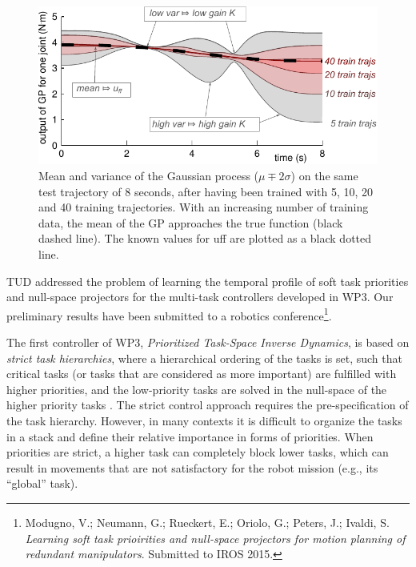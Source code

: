 \begin{figure}
  \centering
  \includegraphics[scale=0.8]{images/meanvariance.pdf}
  \caption{Mean and variance of the Gaussian process ($\mu \mp 2\sigma$) on
    the same test trajectory of 8 seconds, after having been trained with 5,
    10, 20 and 40 training trajectories. With an increasing number of training
    data, the mean of the GP approaches the true function (black dashed
    line). The known values for uff are plotted as a black dotted line.}
  \label{fig:meanvariance}
\end{figure}



TUD addressed the problem of learning the temporal profile of soft
task priorities and null-space projectors for the multi-task controllers
developed in WP3. Our preliminary results have been submitted to a robotics
conference\footnote{Modugno, V.; Neumann, G.; Rueckert, E.; Oriolo, G.; Peters,
J.; Ivaldi, S. \textit{Learning soft task prioirities and null-space projectors
for motion planning of redundant manipulators}. Submitted to IROS 2015.}.

The first controller of WP3, \textit{Prioritized Task-Space Inverse Dynamics},
is based on \textit{strict task hierarchies}, where a hierarchical ordering of
the tasks is set, such that critical tasks (or tasks that are considered as more
important) are fulfilled with higher priorities, and the low-priority tasks are
solved in the null-space of the higher priority tasks
\cite{DelPrete-2014-ID267}. The strict control approach requires the
pre-specification of the task hierarchy. However, in many contexts it is
difficult to organize the tasks in a stack and define their relative importance
in forms of priorities. When priorities are strict, a higher task can completely
block lower tasks, which can result in movements that are not satisfactory for
the robot mission (e.g., its ``global'' task). 

